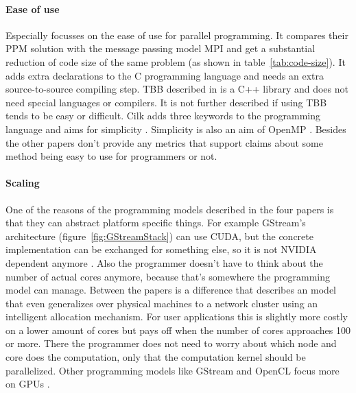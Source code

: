 \paragraph{Ease of use} Especially \cite{BrightwellParallelPhaseModel} focusses
on the ease of use for parallel programming. It compares their PPM solution
with the message passing model MPI and get a substantial reduction of code size
of the same problem (as shown in table~\ref{tab:code-size}). It adds extra
declarations to the C programming language and needs an extra source-to-source
compiling step. TBB described in
\cite{KimExploitingMultiManyCore,CaoPerformanceAnalysis} is a C++ library and
does not need special languages or compilers. It is not further described if
using TBB tends to be easy or difficult. Cilk adds three keywords to the
programming language and aims for simplicity \cite{KimExploitingMultiManyCore}.
Simplicity is also an aim of OpenMP \cite{KimExploitingMultiManyCore}. Besides
\cite{BrightwellParallelPhaseModel} the other papers don't provide any metrics
that support claims about some method being easy to use for programmers or not.

\paragraph{Scaling} One of the reasons of the programming models
described in the four papers is that they can abstract platform specific
things. For example GStream's architecture (figure~\ref{fig:GStreamStack}) can
use CUDA, but the concrete implementation can be exchanged for something else,
so it is not NVIDIA dependent anymore \cite{ZhangDataParallelProgramming}.
Also the programmer doesn't have to think about the number of actual cores
anymore, because that's somewhere the programming model can manage. Between
the papers is a difference that \cite{BrightwellParallelPhaseModel} describes
an model that even generalizes over physical machines to a network cluster
using an intelligent allocation mechanism. For user applications this is
slightly more costly on a lower amount of cores but pays off when the number of
cores approaches 100 or more.  There the programmer does not need to worry
about which node and core does the computation, only that the computation
kernel should be parallelized. Other programming models like GStream and OpenCL
focus more on GPUs \cite{KimExploitingMultiManyCore,
ZhangDataParallelProgramming}.
